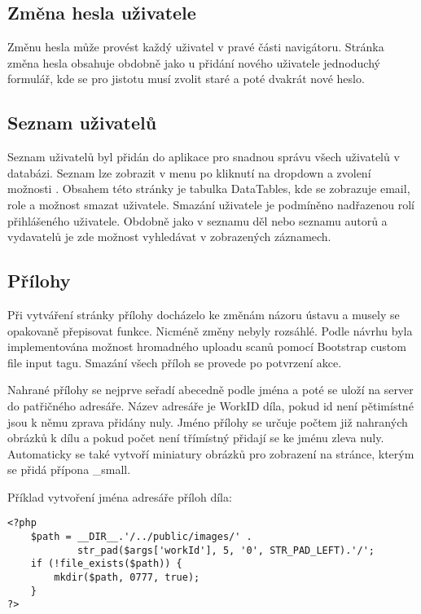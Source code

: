         \subsection{Změna hesla uživatele}
            Změnu hesla může provést každý uživatel v pravé části navigátoru. Stránka změna hesla obsahuje obdobně jako u přidání nového uživatele jednoduchý formulář, kde se pro jistotu musí zvolit staré a poté dvakrát nové heslo.
            
        \subsection{Seznam uživatelů}
            Seznam uživatelů byl přidán do aplikace pro snadnou správu všech uživatelů v databázi. Seznam lze zobrazit v menu po kliknutí na dropdown a zvolení možnosti . Obsahem této stránky je tabulka DataTables, kde se zobrazuje email, role a možnost smazat uživatele. Smazání uživatele je podmíněno nadřazenou rolí přihlášeného uživatele. Obdobně jako v seznamu děl nebo seznamu autorů a vydavatelů je zde možnost vyhledávat v zobrazených záznamech.
        
        \subsection{Přílohy}
            Při vytváření stránky přílohy docházelo ke změnám názoru ústavu a musely se opakovaně přepisovat funkce. Nicméně změny nebyly rozsáhlé. Podle návrhu byla implementována možnost hromadného uploadu scanů pomocí Bootstrap custom file input tagu. Smazání všech příloh se provede po potvrzení akce.
            
            Nahrané přílohy se nejprve seřadí abecedně podle jména a poté se uloží na server do patřičného adresáře. Název adresáře je WorkID díla, pokud id není pětimístné jsou k němu zprava přidány nuly. Jméno přílohy se určuje počtem již nahraných obrázků k dílu a pokud počet není třímístný přidají se ke jménu zleva nuly. Automaticky se také vytvoří miniatury obrázků pro zobrazení na stránce, kterým se přidá přípona \_small.
            
            Příklad vytvoření jména adresáře příloh díla:
            \pagebreak
            \begin{verbatim}
<?php
    $path = __DIR__.'/../public/images/' .
            str_pad($args['workId'], 5, '0', STR_PAD_LEFT).'/';
    if (!file_exists($path)) {
        mkdir($path, 0777, true);
    }
?>
            \end{verbatim}
            
